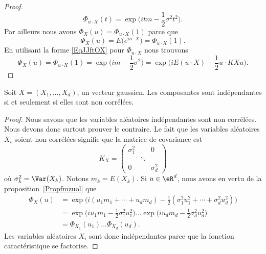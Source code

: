 \begin{proof}
\begin{equation}
		\Phi_{u\cdot X}(t)=\exp\big( itm-\frac{ 1 }{2}\sigma^2t^2 \big).
	\end{equation}
	Par ailleurs nous avons \( \Phi_X(u)=\Phi_{u\cdot X}(1)\) parce que
	\begin{equation}
		\Phi_X(u)=E\big(  e^{iu\cdot X} \big)=\Phi_{u\cdot X}(1).
	\end{equation}
	En utilisant la forme \eqref{EqJJftOX} pour \( \Phi_{u\cdot X}\) nous trouvons
	\begin{equation}
		\Phi_X(u)=\Phi_{u\cdot X}(1)=\exp\big( im-\frac{ 1 }{2}\sigma^2 \big)=\exp\Big( iE(u\cdot X)-\frac{ 1 }{2}u\cdot KXu \Big).
	\end{equation}
\end{proof}

\begin{theorem} \label{ThoPRkxPdQ}
	Soit \( X=(X_1,\ldots, X_d)\), un vecteur gaussien. Les composantes sont indépendantes si et seulement si elles sont non corrélées.
\end{theorem}

\begin{proof}
	Nous savons que les variables aléatoires indépendantes sont non corrélées. Nous devons donc surtout prouver le contraire. Le fait que les variables aléatoires \( X_i\) soient non corrélées signifie que la matrice de covariance est
	\begin{equation}
		K_X=\begin{pmatrix}
			\sigma_1^2 &        & 0          \\
			           & \ddots &            \\
			0          &        & \sigma_d^2
		\end{pmatrix}
	\end{equation}
	où \( \sigma_k^2=\Var(X_k)\). Notons \( m_k=E(X_k)\). Si \( u\in \eR^d\), nous avons en vertu de la proposition~\ref{Propfmzuol} que
	\begin{subequations}
		\begin{align}
			\Phi_X(u) & =\exp\Big( i(u_1m_1+\cdots +u_dm_d)-\frac{ 1 }{2}(\sigma_1^2u_1^2+\cdots +\sigma_d^2u_d^2) \Big)                \\
			          & =\exp\big( iu_1m_1-\frac{ 1 }{2}\sigma_1^2u_1^2 \big)\ldots\exp\big( iu_dm_d-\frac{ 1 }{2}\sigma_d^2u_d^2 \big) \\
			          & =\Phi_{X_1}(u_1)\ldots \Phi_{X_d}(u_d).
		\end{align}
	\end{subequations}
	Les variables aléatoires \( X_i\) sont donc indépendantes parce que la fonction caractéristique se factorise.
\end{proof}

